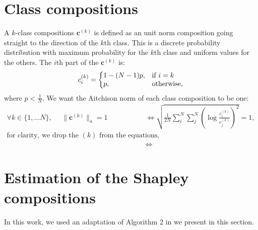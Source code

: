 \documentclass{article}
\theoremstyle{plain}
\theoremstyle{definition}
\theoremstyle{remark}
\begin{document}
\section{Class compositions}

A $k$-class compositions $\bm{c}^{(k)}$ is defined as an unit norm composition going straight to the direction of the $k$th class. This is a discrete probability distribution with maximum probability for the $k$th class and uniform values for the others. The $i$th part of the $\bm{c}^{(k)}$ is:
\begin{equation}
    c_i^{(k)} = \left\lbrace
  \begin{array}{@{}ll@{}}
    1-(N-1)p, & \text{if}\ i=k \\
    p, & \text{otherwise,}
  \end{array}\right.
\end{equation}
where $p<\frac{1}{N}$. We want the Aitchison norm of each class composition to be one:
\begin{equation}
  \begin{aligned}
    \forall k \in \{1, \dots N \},~~~~~~\lVert \bm{c}^{(k)} \rVert_a = 1 &\iff \sqrt{\frac{1}{2N} \sum_i^N \sum_j^N \left( \log \frac{c_i^{(k)}}{c_j^{(k)}} \right)^2} = 1,\\
    \text{for clarity, we drop the $(k)$ from the equations,}\\
    &\iff
  \end{aligned}
\end{equation}

\section{Estimation of the Shapley compositions}
\label{app:algo}
In this work, we used an adaptation of Algorithm 2 in \cite{vstrumbelj2014explaining} we present in this section.
\end{document}
